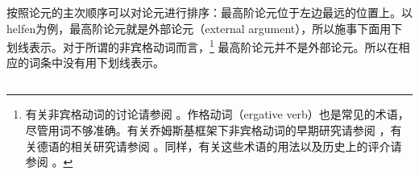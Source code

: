 按照论元的主次顺序可以对论元进行排序：最高阶论元位于左边最远的位置上。以helfen为例，最高阶论元就是外部论元（external argument），所以施事下面用下划线表示。对于所谓的非宾格动词而言，\footnote{%
有关非宾格动词的讨论请参阅 。作格动词（ergative verb）也是常见的术语，尽管用词不够准确。有关乔姆斯基框架下非宾格动词的早期研究请参阅 ，有关德语的相关研究请参阅 。同样，有关这些术语的用法以及历史上的评介请参阅 。
}
最高阶论元并不是外部论元。所以在相应的词条中没有用下划线表示。

\subsection{\xbartc}
\label{Abschnitt-X-Bar}

